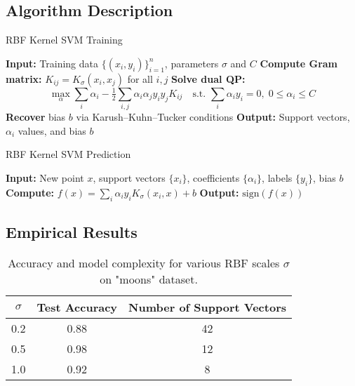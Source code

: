 \documentclass[11pt]{article}
\begin{document}
\subsection{Algorithm Description}
\begin{algorithm}
\caption{RBF Kernel SVM Training}
\begin{algorithmic}[1]
\State \textbf{Input:} Training data $\{(x_i, y_i)\}_{i=1}^n$, parameters $\sigma$ and $C$
\State \textbf{Compute Gram matrix:} $K_{ij}=K_\sigma(x_i,x_j)$ for all $i,j$
\State \textbf{Solve dual QP:}
    \[
      \max_{\alpha}\sum_i \alpha_i
      -\tfrac12\sum_{i,j}\alpha_i\alpha_j y_i y_j K_{ij}
      \quad\text{s.t. }\sum_i \alpha_i y_i=0,\;0\le\alpha_i\le C
    \]
\State \textbf{Recover} bias $b$ via Karush–Kuhn–Tucker conditions
\State \textbf{Output:} Support vectors, $\alpha_i$ values, and bias $b$
\end{algorithmic}
\end{algorithm}

\begin{algorithm}
\caption{RBF Kernel SVM Prediction}
\begin{algorithmic}[1]
\State \textbf{Input:} New point $x$, support vectors $\{x_i\}$, coefficients $\{\alpha_i\}$, labels $\{y_i\}$, bias $b$
\State \textbf{Compute:} $f(x) = \sum_i\alpha_i y_i K_\sigma(x_i,x)+b$
\State \textbf{Output:} $\mathrm{sign}(f(x))$
\end{algorithmic}
\end{algorithm}

\subsection{Empirical Results}
\begin{table}[h]
  \centering
  \begin{tabular}{c c c}
    \hline
    $\sigma$ & Test Accuracy & Number of Support Vectors \\
    \hline
    0.2 & 0.88 & 42 \\
    0.5 & 0.98 & 12 \\
    1.0 & 0.92 & 8 \\
    \hline
  \end{tabular}
  \caption{Accuracy and model complexity for various RBF scales $\sigma$ on "moons" dataset.}
\end{table}

\end{document}
